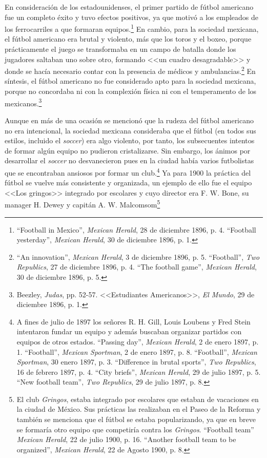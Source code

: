 \documentclass[11pt,a5paper,twoside]{book} %
\begin{document}
En consideración de los estadounidenses, el primer partido de fútbol americano fue
un completo éxito y tuvo efectos positivos, ya que motivó a los empleados de los ferrocarriles
a que formaran equipos.\footnote{``Football in Mexico'', \emph{Mexican Herald}, 28 de diciembre 1896, p. 4. ``Football yesterday'', \emph{Mexican Herald}, 30 de diciembre 1896, p. 1.} En cambio, para la sociedad mexicana, el fútbol americano era
brutal y violento, más que los toros y el boxeo, porque prácticamente el juego se transformaba
en un campo de batalla donde los jugadores saltaban uno sobre otro, formando <<un cuadro desagradable>> y donde se hacía necesario contar con la presencia de médicos y ambulancias.\footnote{``An innovation'', \emph{Mexican Herald}, 3 de diciembre 1896, p. 5. ``Football'', \emph{Two Republics}, 27 de diciembre 1896, p. 4. ``The football game'', \emph{Mexican Herald}, 30 de diciembre 1896, p. 5.} En síntesis, el fútbol americano no fue considerado apto para la sociedad mexicana, porque no concordaba ni con la complexión física ni con el temperamento de los mexicanos.\footnote{Beezley, \emph{Judas}, pp. 52-57. <<Estudiantes Americanos>>, \emph{El Mundo}, 29 de diciembre 1896, p. 1.}

Aunque en más de una ocasión se mencionó que la rudeza del fútbol americano no
era intencional, la sociedad mexicana consideraba que el fútbol (en todos sus estilos, incluido
el \emph{soccer}) era algo violento, por tanto, los subsecuentes intentos de formar algún equipo no
pudieron cristalizarse. Sin embargo, los ánimos por desarrollar el \emph{soccer} no desvanecieron
pues en la ciudad había varios futbolistas que se encontraban ansiosos por formar un club.\footnote{A fines de julio de 1897 los señores R. H. Gill, Louis Loubens y Fred Stein intentaron fundar un equipo y además buscaban organizar partidos con equipos de otros estados. ``Passing day'', \emph{Mexican Herald}, 2 de enero 1897, p. 1. ``Football'', \emph{Mexican Sportman}, 2 de enero 1897, p. 8. ``Football'', \emph{Mexican Sportman}, 30 enero 1897, p. 3. ``Difference in brutal sports'', \emph{Two Republics}, 16 de febrero 1897, p. 4. ``City briefs'', \emph{Mexican Herald}, 29 de julio 1897, p. 5. ``New football team'', \emph{Two Republics}, 29 de julio 1897, p. 8.}
Ya para 1900 la práctica del fútbol se vuelve más consistente y organizada, un ejemplo de ello fue el equipo <<Los gringos>> integrado por escolares y cuyo director era F. W. Bone, su manager H. Dewey y capitán A. W. Malcomsom\footnote{El club \emph{Gringos}, estaba integrado por escolares que estaban de vacaciones en la ciudad de México. Sus prácticas las realizaban en el Paseo de la Reforma y también se menciona que el fútbol se estaba popularizando, ya que en breve se formaría otro equipo que competiría contra los \emph{Gringos}. ``Football team'' \emph{Mexican Herald}, 22 de julio 1900, p. 16. ``Another football team to be organized'', \emph{Mexican Herald}, 22 de Agosto 1900, p. 8.}
\end{document}
